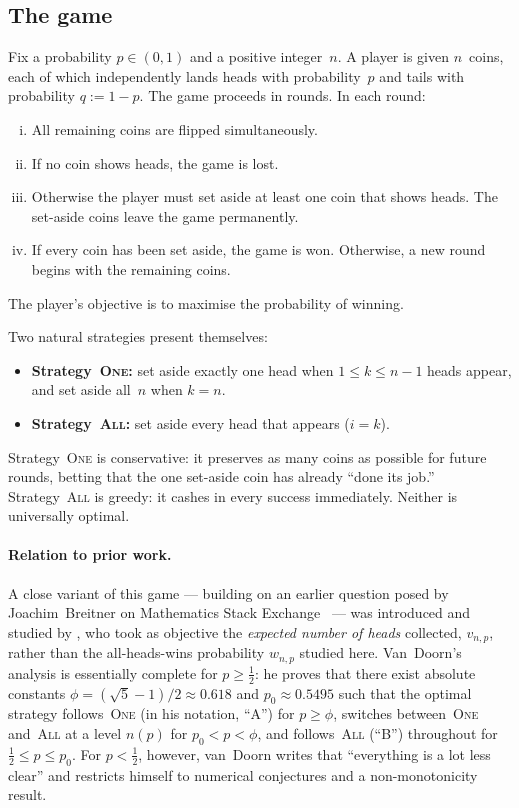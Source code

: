 \documentclass[reqno,final,11pt]{amsart}
\theoremstyle{plain}
\theoremstyle{definition}
\theoremstyle{remark}
\newcommand{\One}{\textsc{One}}
\newcommand{\All}{\textsc{All}}
\begin{document}
\subsection{The game}

Fix a probability $p\in(0,1)$ and a positive integer~$n$.  A player
is given $n$~coins, each of which independently lands heads with
probability~$p$ and tails with probability $q:=1-p$.  The game
proceeds in rounds.  In each round:
\begin{enumerate}[(i)]
\item All remaining coins are flipped simultaneously.
\item If no coin shows heads, the game is lost.
\item Otherwise the player must set aside at least one coin that
  shows heads.  The set-aside coins leave the game permanently.
\item If every coin has been set aside, the game is won.
  Otherwise, a new round begins with the remaining coins.
\end{enumerate}
The player's objective is to maximise the probability of winning.

Two natural strategies present themselves:
\begin{itemize}
\item \textbf{Strategy~\One:} set aside exactly one head when
  $1\le k\le n-1$ heads appear, and set aside all~$n$ when $k=n$.
\item \textbf{Strategy~\All:} set aside every head that appears
  ($i=k$).
\end{itemize}
Strategy~\One{} is conservative: it preserves as many coins as
possible for future rounds, betting that the one set-aside coin has
already ``done its job.''  Strategy~\All{} is greedy: it cashes in
every success immediately.  Neither is universally optimal.

\paragraph{Relation to prior work.}
\sloppy A close variant of this game --- building on an earlier
question posed by Joachim~Breitner on Mathematics Stack
Exchange~\citeyearpar{Breitner2015} --- was introduced and studied by
\citet{vanDoorn2024}, who took as objective the
\emph{expected number of heads} collected, $v_{n,p}$, rather than
the all-heads-wins probability $w_{n,p}$ studied here.  Van~Doorn's
analysis is essentially complete for $p\ge\tfrac12$: he proves
that there exist absolute constants $\phi=(\sqrt5-1)/2\approx
0.618$ and $p_0\approx 0.5495$ such that the optimal strategy
follows~\One{} (in his notation, ``A'') for $p\ge\phi$, switches
between~\One{} and~\All{} at a level $n(p)$ for $p_0<p<\phi$, and
follows~\All{} (``B'') throughout for $\tfrac12\le p\le p_0$.  For
$p<\tfrac12$, however, van~Doorn writes that ``everything is a lot
less clear'' and restricts himself to numerical conjectures and a
non-monotonicity result.
\end{document}
